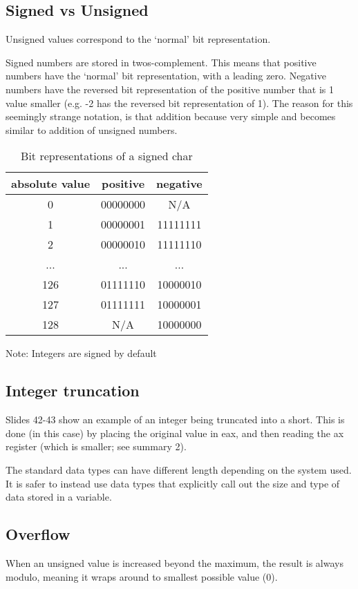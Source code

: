 \documentclass[letterpaper]{article}
\newcommand{\p}{\vspace{1em}\par}		%
\begin{document}
\subsection{Signed vs Unsigned}
Unsigned values correspond to the `normal' bit representation.

\p Signed numbers are stored in twos-complement. This means that positive numbers have the `normal' bit representation, with a leading zero. Negative numbers have the reversed bit representation of the positive number that is 1 value smaller (e.g. -2 has the reversed bit representation of 1). The reason for this seemingly strange notation, is that addition because very simple and becomes similar to addition of unsigned numbers.

\begin{table}
\centering
\begin{tabular}{c|cc}
absolute value & positive & negative\\\hline
0 & 00000000 & N/A\\
1 & 00000001 & 11111111\\
2 & 00000010 & 11111110\\
...& ... & ...\\
126& 01111110 & 10000010\\
127& 01111111 & 10000001\\
128& N/A & 10000000
\end{tabular}
\caption{Bit representations of a signed char}
\end{table}

\p Note: Integers are signed by default

\subsection{Integer truncation}
Slides 42-43 show an example of an integer being truncated into a short. This is done (in this case) by placing the original value in eax, and then reading the ax register (which is smaller; see summary 2).

\p The standard data types can have different length depending on the system used. It is safer to instead use data types that explicitly call out the size and type of data stored in a variable.

\subsection{Overflow}
When an unsigned value is increased beyond the maximum, the result is always modulo, meaning it wraps around to smallest possible value (0).
\end{document}
